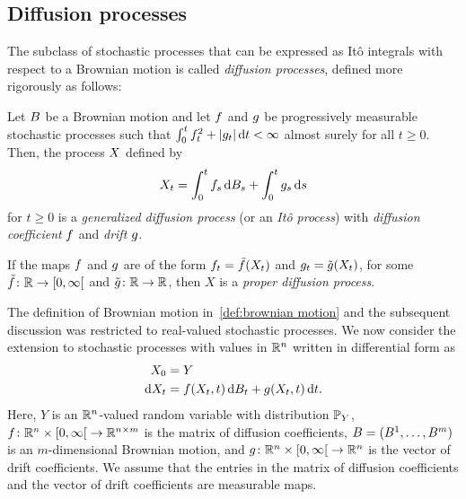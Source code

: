 \subsection{Diffusion processes}%
\label{ssec:diffusion processes}
The subclass of stochastic processes that can be expressed as Itô integrals with respect to a Brownian motion is called \emph{diffusion processes}, defined more rigorously as follows:
\begin{definition}%
	\label{def:diffusion process}
	Let \( B \) be a Brownian motion and let \( f \) and \( g \) be progressively measurable stochastic processes such that \( \int_{\num{0}}^t f^{\num{2}}_t + |g_t|\,\mathrm{d}t < \infty \) almost surely for all \( t \geq \num{0} \).
	Then, the process \( X \) defined by
	\begin{equation}
		X_t = \int_{\num{0}}^t f_s\,\mathrm{d}B_s + \int_{\num{0}}^t g_s\,\mathrm{d}s
	\end{equation}
	for \( t \geq \num{0} \) is a \emph{generalized diffusion process} (or an \emph{Itô process}) with \emph{diffusion coefficient} \( f \) and \emph{drift} \( g \).
	
	If the maps \( f \) and \( g \) are of the form \( f_t = \tilde{f}(X_t) \) and \( g_t = \tilde{g}(X_t) \), for some \( \map{\tilde{\DiffusionCoefficient}}{\R}{\rinterval{0}{\infty}} \) and \( \tilde{g} \colon \mathbb{R} \to \mathbb{R} \), then \( X \) is a \emph{proper diffusion process}.
\end{definition}

The definition of Brownian motion in~\cref{def:brownian motion} and the subsequent discussion was restricted to real-valued stochastic processes.
We now consider the extension to stochastic processes with values in \( \mathbb{R}^n \) written in differential form as
\begin{equation}
	\begin{aligned}
		X_{\num{0}} &= Y \\
		\mathrm{d}X_t &= f(X_t, t)\,\mathrm{d}B_t + g(X_t, t)\,\mathrm{d}t.
	\end{aligned}
	\label{eq:diffusion process}
\end{equation}
Here, \( Y \) is an \( \mathbb{R}^n \)-valued random variable with distribution \( \mathbb{P}_Y \), \( \map{\DiffusionCoefficient}{\R^n \times \rinterval{\num{0}}{\infty}}{\R^{n\times m}} \) is the matrix of diffusion coefficients, \( B = (B^{\num{1}},\dotsc,B^m) \) is an \( m \)-dimensional Brownian motion, and \( \map{\Drift}{\R^n \times \rinterval{0}{\infty}}{\R^{n}} \) is the vector of drift coefficients.
We assume that the entries in the matrix of diffusion coefficients and the vector of drift coefficients are measurable maps.

